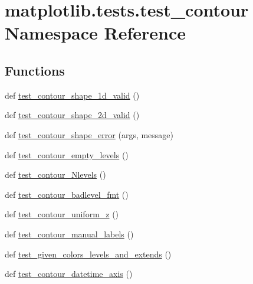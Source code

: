 \hypertarget{namespacematplotlib_1_1tests_1_1test__contour}{}\section{matplotlib.\+tests.\+test\+\_\+contour Namespace Reference}
\label{namespacematplotlib_1_1tests_1_1test__contour}
\subsection*{Functions}
\begin{DoxyCompactItemize}
\item 
def \hyperlink{namespacematplotlib_1_1tests_1_1test__contour_a382815c07e26010563997e8f56d44f92}{test\+\_\+contour\+\_\+shape\+\_\+1d\+\_\+valid} ()
\item 
def \hyperlink{namespacematplotlib_1_1tests_1_1test__contour_acb0c8ea33870236ed19d61779f0081c4}{test\+\_\+contour\+\_\+shape\+\_\+2d\+\_\+valid} ()
\item 
def \hyperlink{namespacematplotlib_1_1tests_1_1test__contour_aaff814c55c15f7773ca47e94445d9fda}{test\+\_\+contour\+\_\+shape\+\_\+error} (args, message)
\item 
def \hyperlink{namespacematplotlib_1_1tests_1_1test__contour_a7338077b18e238d9b7e7fb34a8add3aa}{test\+\_\+contour\+\_\+empty\+\_\+levels} ()
\item 
def \hyperlink{namespacematplotlib_1_1tests_1_1test__contour_a722867b8ddd07034591d6bab82597e3f}{test\+\_\+contour\+\_\+\+Nlevels} ()
\item 
def \hyperlink{namespacematplotlib_1_1tests_1_1test__contour_a72074d39509ed0bac23259ebda118985}{test\+\_\+contour\+\_\+badlevel\+\_\+fmt} ()
\item 
def \hyperlink{namespacematplotlib_1_1tests_1_1test__contour_ada89515e797083654709a4f89a68709c}{test\+\_\+contour\+\_\+uniform\+\_\+z} ()
\item 
def \hyperlink{namespacematplotlib_1_1tests_1_1test__contour_aadcd4158a7572e02bb6486754d051c44}{test\+\_\+contour\+\_\+manual\+\_\+labels} ()
\item 
def \hyperlink{namespacematplotlib_1_1tests_1_1test__contour_af8278414161defe5923801fa81271660}{test\+\_\+given\+\_\+colors\+\_\+levels\+\_\+and\+\_\+extends} ()
\item 
def \hyperlink{namespacematplotlib_1_1tests_1_1test__contour_ad24aa67330646d421c436e515fae64c8}{test\+\_\+contour\+\_\+datetime\+\_\+axis} ()

\end{DoxyCompactItemize}
